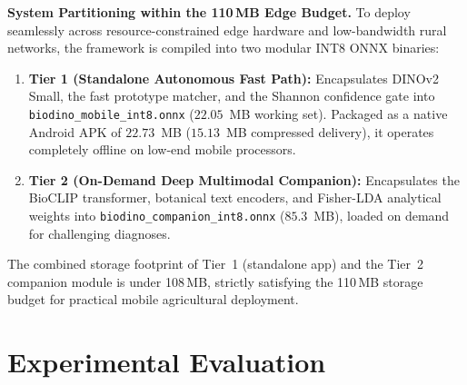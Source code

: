 \documentclass[conference]{IEEEtran}
\begin{document}
\textbf{System Partitioning within the 110\,MB Edge Budget.} To deploy seamlessly across resource-constrained edge hardware and low-bandwidth rural networks, the framework is compiled into two modular INT8 ONNX binaries:
\begin{enumerate}
    \item \textbf{Tier 1 (Standalone Autonomous Fast Path):} Encapsulates DINOv2 Small, the fast prototype matcher, and the Shannon confidence gate into \texttt{biodino\_\allowbreak mobile\_\allowbreak int8.onnx} ($22.05$~MB working set). Packaged as a native Android APK of $22.73$~MB ($15.13$~MB compressed delivery), it operates completely offline on low-end mobile processors.
    \item \textbf{Tier 2 (On-Demand Deep Multimodal Companion):} Encapsulates the BioCLIP transformer, botanical text encoders, and Fisher-LDA analytical weights into \texttt{biodino\_\allowbreak companion\_\allowbreak int8.onnx} ($85.3$~MB), loaded on demand for challenging diagnoses.
\end{enumerate}
The combined storage footprint of Tier~1 (standalone app) and the Tier~2 companion module is under 108\,MB, strictly satisfying the 110\,MB storage budget for practical mobile agricultural deployment.

\section{Experimental Evaluation}
\end{document}
